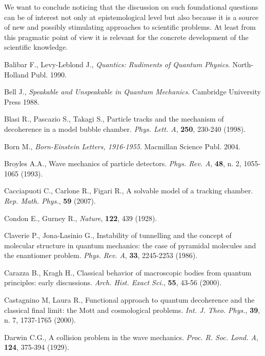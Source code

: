 \documentclass[12pt,reqno]{amsart}
\newcommand{\n}{\relax}
\newcommand{\vs}{\medskip}
\numberwithin{equation}{section}
\begin{document}
\n
We want to conclude noticing  that the discussion  on  such foundational  questions can be of interest  not  only at epistemological level but also because it is  a source  of new and possibly stimulating  approaches to scientific problems. At least from this pragmatic point of view  it is relevant  for the concrete development of the scientific knowledge.

\vs
\vs
\vs
\vs
\vs

\begin{thebibliography}{99}
\vs



 Balibar F., Levy-Leblond J., {\em Quantics: Rudiments of Quantum Physics}. North-Holland Publ. 1990.


 Bell J., {\em Speakable and Unspeakable in Quantum Mechanics}. Cambridge University Press  1988.

 Blasi R., Pascazio S., Takagi S., Particle tracks and the mechanism of decoherence in a model bubble chamber. {\em Phys. Lett. A}, {\bf 250}, 230-240 (1998).


 Born M., {\em Born-Einstein Letters, 1916-1955}. Macmillan Science Publ. 2004.

 Broyles A.A., Wave mechanics of particle detectors. {\em Phys. Rev. A}, {\bf 48}, n. 2, 1055-1065 (1993).

 Cacciapuoti C., Carlone R., Figari R., 
A solvable model of a tracking chamber. 
{\em Rep. Math. Phys.}, {\bf 59} (2007).

 Condon E., Gurney R., {\em Nature}, {\bf 122}, 439 (1928).

 Claverie P., Jona-Lasinio G., Instability of tunnelling and the concept of molecular structure in quantum mechanics: the case of pyramidal molecules and the enantiomer problem. {\em Phys. Rev. A}, {\bf 33}, 2245-2253 (1986).

 Carazza B., Kragh H., Classical  behavior of macroscopic bodies from quantum principles: early discussions. {\em Arch. Hist. Exact Sci.}, {\bf 55}, 43-56 (2000).



 Castagnino M, Laura R., Functional approach to quantum decoherence and the classical final limit: the Mott and cosmological problems. {\em Int. J. Theo. Phys.}, {\bf 39}, n. 7, 1737-1765 (2000).

 Darwin C.G., A collision problem in the wave mechanics. {\em Proc. R. Soc.
Lond. A}, {\bf  124}, 375-394 (1929).


\end{thebibliography}
\end{document}
